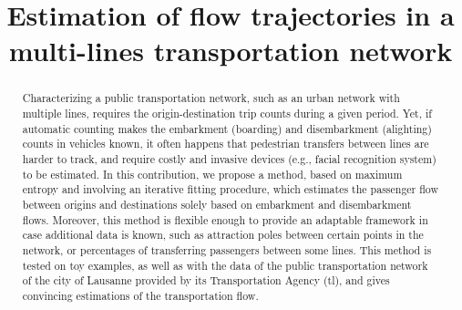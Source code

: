 \documentclass{bmcart}
\begin{document}
\begin{frontmatter}

\begin{fmbox}


\title{Estimation of flow trajectories in a multi-lines transportation network}

\author[
  addressref={aff1},                   
  corref={aff1},                       
  email={gguex@unil.ch}
]{ }
\author[
  addressref={aff2},
  email={rloup@unil.ch}
]{ }
\author[
addressref={aff1, aff2},
email={fbavaud@unil.ch}
]{ }

\address[id=aff1]{%
  ,             
  ,          
  ,                              
}
\address[id=aff2]{%
  ,
  ,          
  ,                       
}

\end{fmbox}


\begin{abstractbox}

\begin{abstract} %
Characterizing a public transportation network, such as an urban network with multiple lines, requires the origin-destination trip counts during a given period. Yet, if automatic counting makes the embarkment (boarding) and disembarkment (alighting) counts in vehicles known, it often happens that pedestrian transfers between lines are harder to track, and require costly and invasive devices (e.g., facial recognition system) to be estimated. In this contribution, we propose a method, based on maximum entropy and involving an iterative fitting procedure, which estimates the passenger flow between origins and destinations solely based on embarkment and disembarkment flows. Moreover, this method is flexible enough to provide an adaptable framework in case additional data is known, such as attraction poles between certain points in the network, or percentages of transferring passengers between some lines. This method is tested on toy examples, as well as with the data of the public transportation network of the city of Lausanne provided by its Transportation Agency (tl), and gives convincing estimations of the transportation flow.
\end{abstract}


\end{abstractbox}
\end{frontmatter}
\end{document}
